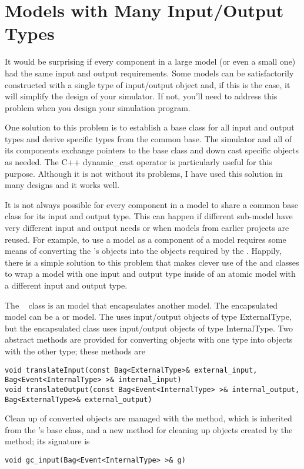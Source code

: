 \chapter{Models with Many Input/Output Types}
\label{section:models_with_many_io_types}
It would be surprising if every component in a large model (or even a small one) had the same input and output requirements. Some models can be satisfactorily constructed with a single type of input/output object and, if this is the case, it will simplify the design of your simulator. If not, you'll need to address this problem when you design your simulation program.
 
One solution to this problem is to establish a base class for all input and output types and derive specific types from the common base. The simulator and all of its components exchange pointers to the base class and down cast specific objects as needed. The C++ dynamic\_cast operator is particularly useful for this purpose. Although it is not without its problems, I have used this solution in many designs and it works well.

It is not always possible for every component in a model to share a common base class for its input and output type. This can happen if different sub-model have very different input and output needs or when models from earlier projects are reused. For example, to use a  model as a component of a  model requires some means of converting the 's  objects into the  objects required by the . Happily, there is a simple solution to this problem that makes clever use of the  and  classes to wrap a model with one input and output type inside of an atomic model with a different input and output type.

The \adevs\  class is an  model that encapsulates another model. The encapsulated model can be a  or  model. The  uses input/output objects of type ExternalType, but the encapsulated class uses input/output objects of type InternalType. Two abstract methods are provided for converting objects with one type into objects with the other type; these methods are
\begin{verbatim}
void translateInput(const Bag<ExternalType>& external_input, Bag<Event<InternalType> >& internal_input)
void translateOutput(const Bag<Event<InternalType> >& internal_output, Bag<ExternalType>& external_output) 
\end{verbatim}
Clean up of converted objects are managed with the  method, which is inherited from the 's  base class, and a new  method for cleaning up objects created by the  method; its signature is
\begin{verbatim}
void gc_input(Bag<Event<InternalType> >& g)
\end{verbatim}

